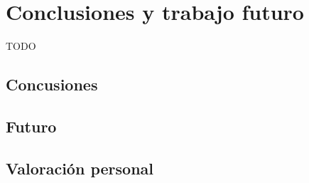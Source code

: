 
\chapter{Conclusiones y trabajo futuro}

TODO

\section{Concusiones}

\section{Futuro}

\section{Valoración personal}
